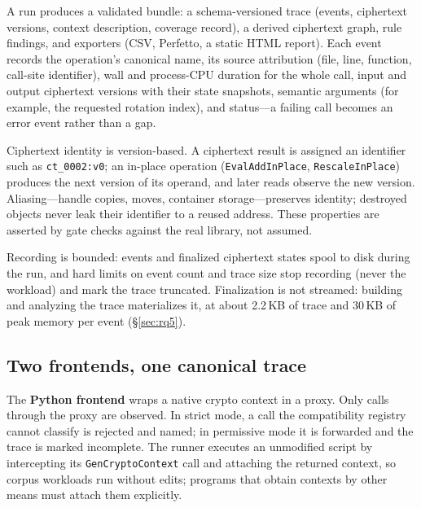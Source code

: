 \documentclass[sigconf,nonacm]{acmart}
\begin{document}
A run produces a validated bundle: a schema-versioned trace (events,
ciphertext versions, context description, coverage record), a derived
ciphertext graph, rule findings, and exporters (CSV, Perfetto, a static HTML
report). Each event records the operation's canonical name, its source
attribution (file, line, function, call-site identifier), wall and
process-CPU duration for the whole call, input and output ciphertext
versions with their state snapshots, semantic arguments (for example, the
requested rotation index), and status---a failing call becomes an error
event rather than a gap.

Ciphertext identity is version-based. A ciphertext result is assigned an
identifier such as \texttt{ct\_0002:v0}; an in-place operation
(\texttt{EvalAddInPlace}, \texttt{RescaleInPlace}) produces the next version
of its operand, and later reads observe the new version. Aliasing---handle
copies, moves, container storage---preserves identity; destroyed objects
never leak their identifier to a reused address. These properties are
asserted by gate checks against the real library, not assumed.

Recording is bounded: events and finalized ciphertext states spool to disk
during the run, and hard limits on event count and trace size stop recording
(never the workload) and mark the trace truncated. Finalization is not
streamed: building and analyzing the trace materializes it, at about
2.2\,KB of trace and 30\,KB of peak memory per event (\S\ref{sec:rq5}).

\subsection{Two frontends, one canonical trace}
\label{sec:frontends}

The \textbf{Python frontend} wraps a native crypto context in a proxy. Only
calls through the proxy are observed. In strict mode, a call the
compatibility registry cannot classify is rejected and named; in permissive
mode it is forwarded and the trace is marked incomplete. The runner executes
an unmodified script by intercepting its \texttt{GenCryptoContext} call and
attaching the returned context, so corpus workloads run without edits;
programs that obtain contexts by other means must attach them explicitly.
\end{document}
